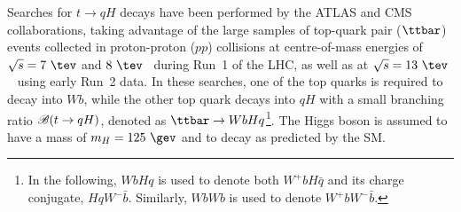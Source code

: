\documentclass[PAPER, coverpage, atlasdraft=true, texlive=2016, UKenglish]{\ATLASLATEXPATH atlasdoc} %
\begin{document}
Searches for $t \to qH$ decays have been performed by the ATLAS and CMS collaborations, taking advantage of the large samples
of top-quark pair ($\ttbar$) events collected in proton-proton ($pp$) collisions at centre-of-mass energies of $\sqrt{s}=7~\tev$ and $8~\tev$~\cite{Aad:2014dya,Aad:2015pja,Khachatryan:2016atv} during Run~1 of the LHC, as well as at $\sqrt{s}=13~\tev$~\cite{fcnc36} using early Run~2 data.
In these searches, one of the top quarks is required to decay into $Wb$, while the other top quark decays into $qH$ with a small branching ratio 
 $\mathscr{B}(t\to qH)$, denoted as $\ttbar \to WbHq$\footnote{In the following, $WbHq$ is used to denote both $W^+b H\bar{q}$ and its charge conjugate, $HqW^- \bar{b}$. Similarly, 
$WbWb$ is used to denote $W^+b W^- \bar{b}$.}.  The Higgs boson is assumed to have a mass of $m_H=125~\gev$ and to decay as predicted by
the SM.
\end{document}
